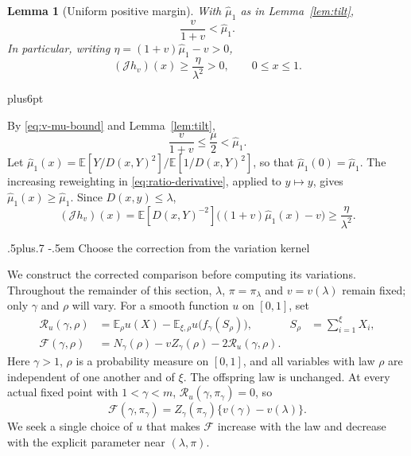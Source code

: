 \documentclass[11pt,reqno]{amsart}
\makeatletter
\def\subsection{\@startsection{subsection}{2}{0pt}%
  {.5\linespacing plus.7\linespacing}
  {-.5em}
  {\normalfont\scshape}}
\theoremstyle{plain}
\newtheorem{lemma}[theorem]{Lemma}
\theoremstyle{definition}
\theoremstyle{remark}
\renewenvironment{proof}[1][\proofname]{%
  \par
  \pushQED{\qed}%
  \normalfont
  \topsep6pt plus6pt\relax
  \trivlist
  \item[\hskip\labelsep\slshape #1\@addpunct{.}]%
  \ignorespaces
}{%
  \popQED
  \endtrivlist
  \@endpefalse
}
\DeclareRobustCommand{\qed}{%
  \leavevmode\unskip\penalty9999\hbox{}\nobreak
  \ifmmode
    \makebox[0pt][l]{\qquad\hbox{\qedsymbol}}%
  \else
    \qquad\hbox{\qedsymbol}%
  \fi
}
\renewcommand{\qedsymbol}{\rule[.47pt]{4pt}{6pt}}
\numberwithin{equation}{section}
\newcommand{\E}{\mathbb E}
\newcommand{\cJ}{\mathcal J}
\newcommand{\cF}{\mathcal F}
\newcommand{\res}{\mathcal R}
\makeatother
\begin{document}
\begin{lemma}[Uniform positive margin]\label{lem:positive-kernel}
With $\widehat\mu_1$ as in Lemma~\ref{lem:tilt},
\begin{equation}\label{eq:threshold-k}
 \frac{v}{1+v}<\widehat\mu_1.
\end{equation}
In particular, writing $\eta=(1+v)\widehat\mu_1-v>0$,
\begin{equation}\label{eq:J-positive}
 (\cJ h_v)(x)\ge\frac{\eta}{\lambda^2}>0,
 \qquad 0\le x\le1.
\end{equation}
\end{lemma}

\begin{proof}
By \eqref{eq:v-mu-bound} and Lemma~\ref{lem:tilt},
\begin{equation}\label{eq:v-mu-k}
 \frac{v}{1+v}\le\frac\mu2<\widehat\mu_1.
\end{equation}
Let $\widehat\mu_1(x)=\E[Y/D(x,Y)^2]/\E[1/D(x,Y)^2]$, so that
$\widehat\mu_1(0)=\widehat\mu_1$. The increasing reweighting in
\eqref{eq:ratio-derivative}, applied to $y\mapsto y$, gives
$\widehat\mu_1(x)\ge\widehat\mu_1$. Since $D(x,y)\le\lambda$,
\[
 (\cJ h_v)(x)
 =\E[D(x,Y)^{-2}]\bigl((1+v)\widehat\mu_1(x)-v\bigr)
 \ge\frac{\eta}{\lambda^2}.
\]
\end{proof}



\subsection{Choose the correction from the variation kernel}

We construct the corrected comparison before computing its variations.
Throughout the remainder of this section, $\lambda$, $\pi=\pi_\lambda$
and $v=v(\lambda)$ remain fixed; only $\gamma$ and $\rho$ will vary. For a smooth
function $u$ on $[0,1]$, set
\begin{align}
 \res_u(\gamma,\rho)
 &=\E_\rho u(X)-\E_{\xi,\rho}u\bigl(f_\gamma(S_\rho)\bigr),
 &S_\rho&=\sum_{i=1}^{\xi}X_i,\label{eq:residual}\\
 \cF(\gamma,\rho)
 &=N_\gamma(\rho)-vZ_\gamma(\rho)-2\res_u(\gamma,\rho).
 \label{eq:corrected-functional}
\end{align}
Here $\gamma>1$, $\rho$ is a probability measure on $[0,1]$, and all
variables with law $\rho$ are independent of one another and of $\xi$.
The offspring law is unchanged. At every actual fixed point with
$1<\gamma<m$,
$\res_u(\gamma,\pi_\gamma)=0$, so
\begin{equation}\label{eq:on-curve}
 \boxed{\quad
 \cF(\gamma,\pi_\gamma)
 =Z_\gamma(\pi_\gamma)\{v(\gamma)-v(\lambda)\}.
 \quad}
\end{equation}
We seek a single choice of $u$ that makes $\cF$ increase with the law
and decrease with the explicit parameter near $(\lambda,\pi)$.
\end{document}
